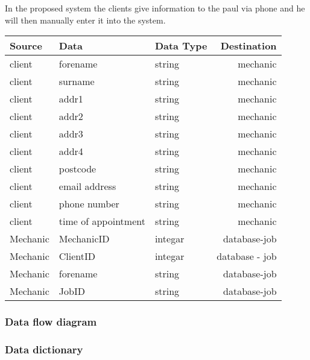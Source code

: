In the proposed system the clients give information to the paul  via phone and he will then manually enter it into the system.



\begin{tabular}{|l|p{4cm}|p{4cm}|r|}
\hline
Source & Data & Data Type & Destination\\ \hline
client & forename & string & mechanic\\ \hline
client & surname & string & mechanic\\ \hline
client & addr1 & string & mechanic\\ \hline
client & addr2 & string & mechanic\\ \hline
client & addr3 & string & mechanic\\ \hline
client & addr4 & string & mechanic\\ \hline
client & postcode & string & mechanic\\ \hline
client & email address & string & mechanic\\ \hline
client & phone number & string & mechanic\\ \hline
client & time of appointment & string & mechanic\\ \hline
Mechanic & MechanicID & integar & database-job \\ \hline
Mechanic & ClientID & integar & database - job\\ \hline
Mechanic & forename & string & database-job\\ \hline
Mechanic & JobID & string & database-job\\ \hline





\hline
\end{tabular}
	
	

	\subsubsection{Data flow diagram}

	

	\subsubsection{Data dictionary}
	
